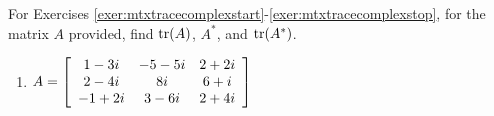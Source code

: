 \noindent For Exercises \ref{exer:mtxtracecomplexstart}-\ref{exer:mtxtracecomplexstop}, for the matrix $A$ provided, find $\tr(A)$, $A^*$, and $\tr(A^*)$.
\begin{enumerate}[!HW!]
\item\label{exer:mtxtracecomplexstart}\label{exer:mtxtracecomplexstop} $A=\mtx{ccc}{1-3i&-5-5i&2+2i\\2-4i&8i&6+i\\-1+2i&3-6i&2+4i}$\\ %
\end{enumerate}

 \pagebreak